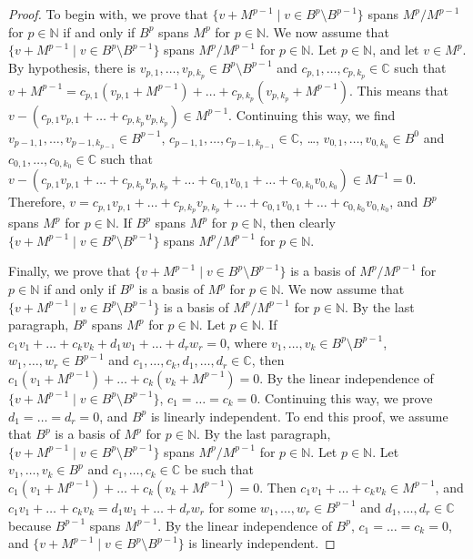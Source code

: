 \documentclass[a4paper, 12pt, reqno]{amsart}
\theoremstyle{remark}
\begin{document}
\begin{proof}
  To begin with, we prove that $\{v + M^{p - 1} \mid v \in B^p \setminus B^{p - 1}\}$ spans $M^p/M^{p - 1}$ for $p \in \mathbb{N}$ if and only if $B^p$ spans $M^p$ for $p \in \mathbb{N}$.
  We now assume that $\{v + M^{p - 1} \mid v \in B^p \setminus B^{p - 1}\}$ spans $M^p/M^{p - 1}$ for $p \in \mathbb{N}$.
  Let $p \in \mathbb{N}$, and let $v \in M^p$.
  By hypothesis, there is $v_{p, 1}, \dots, v_{p, k_p} \in B^p \setminus B^{p - 1}$ and $c_{p, 1}, \dots, c_{p, k_p} \in \mathbb{C}$ such that $v + M^{p - 1} = c_{p, 1}(v_{p, 1} + M^{p - 1}) + \dots + c_{p, k_p}(v_{p, k_p} + M^{p - 1})$.
  This means that $v - (c_{p, 1}v_{p, 1} + \dots +  c_{p, k_p}v_{p, k_p}) \in M^{p - 1}$.
  Continuing this way, we find $v_{p - 1, 1}, \dots, v_{p - 1, k_{p - 1}} \in B^{p - 1}$, $c_{p - 1, 1}, \dots, c_{p - 1, k_{p - 1}} \in \mathbb{C}$, \dots, $v_{0, 1}, \dots, v_{0, k_0} \in B^0$ and $c_{0, 1}, \dots, c_{0, k_0} \in \mathbb{C}$ such that $v - (c_{p, 1}v_{p, 1} + \dots + c_{p, k_p}v_{p, k_p} + \dots + c_{0, 1}v_{0, 1} + \dots + c_{0, k_0}v_{0, k_0}) \in M^{-1} = 0$.
  Therefore, $v = c_{p, 1}v_{p, 1} + \dots + c_{p, k_p}v_{p, k_p} + \dots + c_{0, 1}v_{0, 1} + \dots + c_{0, k_0}v_{0, k_0}$, and $B^p$ spans $M^p$ for $p \in \mathbb{N}$.
  If $B^p$ spans $M^p$ for $p \in \mathbb{N}$, then clearly $\{v + M^{p - 1} \mid v \in B^p \setminus B^{p - 1}\}$ spans $M^p/M^{p - 1}$ for $p \in \mathbb{N}$.

  Finally, we prove that $\{v + M^{p - 1} \mid v \in B^p \setminus B^{p - 1}\}$ is a basis of $M^p/M^{p - 1}$ for $p \in \mathbb{N}$ if and only if $B^p$ is a basis of $M^p$ for $p \in \mathbb{N}$.
  We now assume that $\{v + M^{p - 1} \mid v \in B^p \setminus B^{p - 1}\}$ is a basis of $M^p/M^{p - 1}$ for $p \in \mathbb{N}$.
  By the last paragraph, $B^p$ spans $M^p$ for $p \in \mathbb{N}$.
  Let $p \in \mathbb{N}$.
  If $c_1v_1 + \dots + c_kv_k + d_1w_1 + \dots + d_rw_r = 0$, where $v_1, \dots, v_k \in B^p \setminus B^{p - 1}$, $w_1, \dots, w_r \in B^{p - 1}$ and $c_1, \dots, c_k, d_1, \dots, d_r \in \mathbb{C}$, then $c_1(v_1 + M^{p - 1}) + \dots + c_k(v_k + M^{p - 1}) = 0$.
  By the linear independence of $\{v + M^{p - 1} \mid v \in B^p \setminus B^{p - 1}\}$, $c_1 = \dots = c_k= 0$.
  Continuing this way, we prove $d_1 = \dots = d_r = 0$, and $B^p$ is linearly independent.
  To end this proof, we assume that $B^p$ is a basis of $M^p$ for $p \in \mathbb{N}$.
  By the last paragraph, $\{v + M^{p - 1} \mid v \in B^p \setminus B^{p - 1}\}$ spans $M^p/M^{p - 1}$ for $p \in \mathbb{N}$.
  Let $p \in \mathbb{N}$.
  Let $v_1, \dots, v_k \in B^p$ and $c_1, \dots, c_k \in \mathbb{C}$ be such that $c_1(v_1 + M^{p - 1}) + \dots + c_k(v_k + M^{p - 1}) = 0$.
  Then $c_1v_1 + \dots + c_kv_k \in M^{p - 1}$, and $c_1v_1 + \dots + c_kv_k = d_1w_1 + \dots + d_rw_r$ for some $w_1, \dots, w_r \in B^{p - 1}$ and $d_1, \dots, d_r \in \mathbb{C}$ because $B^{p - 1}$ spans $M^{p - 1}$.
  By the linear independence of $B^p$, $c_1 = \dots = c_k = 0$, and $\{v + M^{p - 1} \mid v \in B^p \setminus B^{p - 1}\}$ is linearly independent.
\end{proof}
\end{document}
